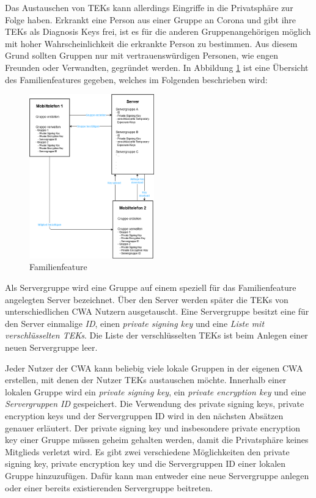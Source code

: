 \documentclass[conference]{IEEEtran}
\begin{document}
Das Austauschen von TEKs kann allerdings Eingriffe in die Privatsphäre zur Folge haben.
Erkrankt eine Person aus einer Gruppe an Corona und gibt ihre TEKs als Diagnosis Keys frei, ist es für die anderen Gruppenangehörigen möglich mit hoher Wahrscheinlichkeit die erkrankte Person zu bestimmen.
Aus diesem Grund sollten Gruppen nur mit vertrauenswürdigen Personen, wie engen Freunden oder Verwandten, gegründet werden.
In Abbildung \ref{Familienfeature_Abbildung} ist eine Übersicht des Familienfeatures gegeben, welches im Folgenden beschrieben wird:

\begin{figure}[h]
	\centering
	\includegraphics[width=0.48\textwidth]{"Familiengruppe"}
	\caption{Familienfeature}
	\label{Familienfeature_Abbildung}
\end{figure}
Als Servergruppe wird eine Gruppe auf einem speziell für das Familienfeature angelegten Server bezeichnet.
Über den Server werden später die TEKs von unterschiedlichen CWA Nutzern ausgetauscht.
Eine Servergruppe besitzt eine für den Server einmalige \textit{ID}, einen \textit{private signing key} und eine \textit{Liste mit verschlüsselten TEKs}.
Die Liste der verschlüsselten TEKs ist beim Anlegen einer neuen Servergruppe leer.

Jeder Nutzer der CWA kann beliebig viele lokale Gruppen in der eigenen CWA erstellen, mit denen der Nutzer TEKs austauschen möchte.
Innerhalb einer lokalen Gruppe wird ein \textit{private signing key}, ein \textit{private encryption key} und eine \textit{Servergruppen ID} gespeichert.
Die Verwendung des private signing keys, private encryption keys und der Servergruppen ID wird in den nächsten Absätzen genauer erläutert.
Der private signing key und insbesondere private encryption key einer Gruppe müssen geheim gehalten werden, damit die Privatsphäre keines Mitglieds verletzt wird.
Es gibt zwei verschiedene Möglichkeiten den private signing key, private encryption key und die Servergruppen ID einer lokalen Gruppe hinzuzufügen.
Dafür kann man entweder eine neue Servergruppe anlegen oder einer bereits existierenden Servergruppe beitreten.
\end{document}
